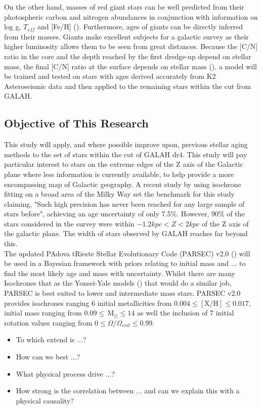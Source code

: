 \documentclass[fleqn,usenatbib]{mnras}
\newcommand{\Msol}{\,\mathrm{M_\odot}} %
\begin{document}
On the other hand, masses of red giant stars can be well predicted from their photospheric carbon and nitrogen abundances in conjunction with information on log g, \(T_{eff}\) and [Fe/H] (\citet{Martigetal2016}). Furthermore, ages of giants can be directly inferred from their masses. Giants make excellent subjects for a galactic survey as their higher luminosity allows them to be seen from great distances. Because the [C/N] ratio in the core and the depth reached by the first dredge-up depend on stellar mass, the final [C/N] ratio at the surface depends on stellar mass (\citet{Martigetal2016}). a model will be trained and tested on stars with ages derived accurately from K2 Asteroseismic data and then applied to the remaining stars within the cut from GALAH.

\subsection{Objective of This Research} \label{sec:intro_objectives}
This study will apply, and where possible improve upon, previous stellar aging methods to the set of stars within the cut of GALAH dr4. This study will pay particular interest to stars on the extreme edges of the Z axis of the Galactic plane where less information is currently available, to help provide a more encompassing map of Galactic geography. A recent study by \citet{2022Natur} using isochrone fitting on a broad area of the Milky Way set the benchmark for this study claiming, "Such high precision has never been reached for any large sample of stars before", achieving an age uncertainty of only 7.5\%. However, 90\% of the stars considered in the survey were within \(-1.2kpc < Z < 2kpc\)  of the Z axis of the galactic plane. The width of stars observed by GALAH reaches far beyond this.  \\
The updated PAdova tRieste Stellar Evolutionary Code (PARSEC) v2.0 (\cite{Costaetal2019a, Costaetal2019b,Nguyenetal2022}) will be used in a Bayesian framework with priors relating to initial mass and ... to find the most likely age and mass with uncertainty. Whilst there are many Isochrones that as the Yonsei-Yale models (\citet{Yi2003}) that would do a similar job, PARSEC is best suited to lower and intermediate mass stars. PARSEC v2.0 provides isochrones ranging 6 initial metallicities from \(0.004 \leq \mathrm{[X/H]} \leq 0.017\), initial mass ranging from \(0.09\leq \Msol\leq14\) as well the inclusion of 7 initial rotation values ranging from \(0\leq \Omega/\Omega_{crit}\leq 0.99\). 
\begin{itemize}
    \item To which extend is ...?
    \item How can we best ...?
    \item What physical process drive ...?
    \item How strong is the correlation between ... and can we explain this with a physical causality?
\end{itemize}
\end{document}
